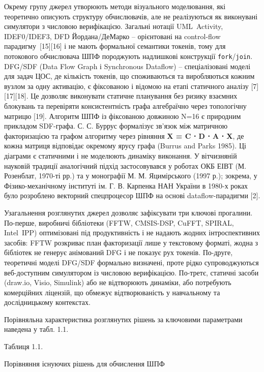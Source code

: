 \documentclass[
]{article}
\begin{document}
Окрему групу джерел утворюють методи візуального моделювання, які
теоретично описують структуру обчислювачів, але не реалізуються як
виконувані симулятори з числовою верифікацією. Загальні нотації
UML~Activity, IDEF0/IDEF3, DFD Йордана/ДеМарко -- орієнтовані на
control-flow парадигму~{[}15{]}{[}16{]} і не мають формальної семантики
токенів, тому для потокового обчислювача ШПФ породжують надлишкові
конструкції \texttt{fork}/\texttt{join}. DFG/SDF (Data Flow Graph і
Synchronous Dataflow) -- спеціалізовані моделі для задач ЦОС, де
кількість токенів, що споживаються та виробляються кожним вузлом за одну
активацію, є фіксованою і відомою на етапі статичного аналізу
{[}7{]}{[}17{]}{[}18{]}. Це дозволяє виконувати статичне планування без
ризику взаємних блокувань та перевіряти консистентність графа
алгебраїчно через топологічну матрицю {[}19{]}. Алгоритм ШПФ із
фіксованою довжиною N=16 є природним прикладом SDF-графа. С. С. Буррус
формалізує зв'язок між матричною факторизацією та графом алгоритму через
рівняння \textbf{X\textquotesingle{} = C ⋅ D ⋅ A ⋅ X}, де кожна матриця
відповідає окремому ярусу графа (Burrus and Parks 1985). Ці діаграми є
статичними і не моделюють динаміку виконання. У вітчизняній науковій
традиції аналогічний підхід застосовувався у роботах ОКБ ЕІВТ (М.
Розенблат, 1970-ті рр.) та у монографії М. М. Яцимірського (1997 р.);
зокрема, у Фізико-механічному інституті ім. Г. В. Карпенка НАН України в
1980-х роках було розроблено векторний спецпроцесор ШПФ на основі
dataflow-парадигми {[}2{]}.

Узагальнення розглянутих джерел дозволяє зафіксувати три ключові
прогалини. По-перше, виробничі бібліотеки (FFTW, CMSIS-DSP, CuFFT,
SPIRAL, Intel~IPP) оптимізовані під продуктивність і не надають жодних
інтроспективних засобів: FFTW розкриває план факторизації лише у
текстовому форматі, жодна з бібліотек не генерує анімований DFG і не
показує рух токенів. По-друге, теоретичні моделі DFG/SDF формально
визначені, проте рідко супроводжуються веб-доступним симулятором із
числовою верифікацією. По-третє, статичні засоби (draw.io, Visio,
Simulink) або не відтворюють динаміки, або потребують комерційних
ліцензій, що обмежує відтворюваність у навчальному та дослідницькому
контекстах.

Порівняльна характеристика розглянутих рішень за ключовими параметрами
наведена у табл. 1.1.

Таблиця 1.1.

Порівняння існуючих рішень для обчислення ШПФ
\end{document}
